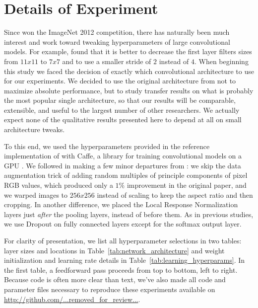 \section{Details of Experiment}

Since \cite{Krizhevsky-2012} won the ImageNet 2012 competition, there has naturally been much interest and work toward tweaking hyperparameters of large convolutional models. For example, \cite{Zeiler+et+al-arxiv2013b} found that it is better to decrease the first layer filters sizes from $11x11$ to $7x7$ and to use a smaller stride of $2$ instead of $4$. When beginning this study we faced the decision of exactly which convolutional architecture to use for our experiments. We decided to use the original architecture from \cite{Krizhevsky-2012} not to maximize absolute performance, but to study transfer results on what is probably the most popular single architecture, so that our results will be comparable, extensible, and useful to the largest number of other researchers. We actually expect none of the qualitative results presented here to depend at all on small architecture tweaks.

To this end, we used the hyperparameters provided in the reference implementation of  \cite{Krizhevsky-2012} with Caffe, a library for training convolutional models on a GPU \cite{donahue+jia-2013-arxiv}. We followed \cite{donahue+jia-2013-arxiv} in making a few minor departures from \cite{Krizhevsky-2012}: we skip the data augmentation trick of adding random multiples of principle components of pixel RGB values, which produced only a $1\%$ improvement in the original paper, and we warped images to $256x256$ instead of scaling to keep the aspect ratio and then cropping. In another difference, we placed the Local Response Normalization layers just \emph{after} the pooling layers, instead of before them. As in previous studies, we use Dropout \citep{Hinton-et-al-arxiv2012} on fully connected layers except for the softmax output layer.


For clarity of presentation, we list all hyperparameter selections in two tables: layer sizes and locations in Table~\ref{tab:network_architecture} and weight initialization and learning rate details in Table~\ref{tab:learning_hyperparams}. In the first table, a feedforward pass proceeds from top to bottom, left to right. Because code is often more clear than text, we've also made all code and parameter files necessary to reproduce these experiments available on \url{http://github.com/...removed_for_review...}.


